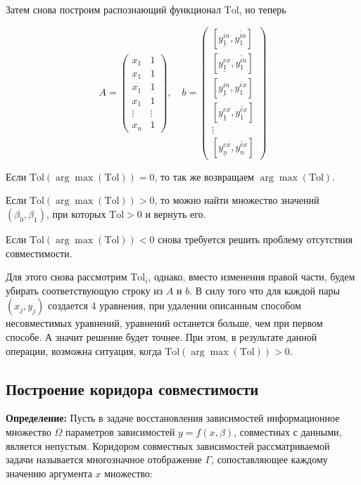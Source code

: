 Затем снова построим распознающий функционал $\text{Tol}$, но теперь

\begin{equation}
    A =
    \begin{pmatrix}
        x_1 & 1\\
        x_1 & 1\\
        x_1 & 1\\
        x_1 & 1\\
        \vdots & \vdots\\
        x_n & 1
    \end{pmatrix}, \quad
    b =
    \begin{pmatrix}
        [\underline{y_{1}^{in}}, \overline{y_{1}^{in}}]\\
        [\underline{y_{1}^{ex}}, \overline{y_{1}^{in}}]\\
        [\underline{y_{1}^{in}}, \overline{y_{1}^{ex}}]\\
        [\underline{y_{1}^{ex}}, \overline{y_{1}^{ex}}]\\
        \vdots \\
        [\underline{y_{n}^{ex}}, \overline{y_{n}^{ex}}]
    \end{pmatrix}
\end{equation}

Если $\text{Tol}(\arg\max(\text{Tol})) = 0$, то так же возвращаем $\arg\max(\text{Tol})$. 

Если $\text{Tol}(\arg\max(\text{Tol})) > 0$, то можно найти множество значений $(\beta_0, \beta_1)$, при которых $\text{Tol} > 0$ и вернуть его.

Если $\text{Tol}(\arg\max(\text{Tol})) < 0$ снова требуется решить проблему отсутствия совместимости.

Для этого снова рассмотрим $\text{Tol}_i$, однако, вместо изменения правой части, будем убирать соответствующую строку из $A$ и $b$. В силу того что для каждой пары $(x_j, y_j)$ создается 4 уравнения, при удалении описанным способом несовместимых уравнений, уравнений останется больше, чем при первом способе. А значит решение будет точнее. При этом, в результате данной операции, возможна ситуация, когда $\text{Tol}(\arg\max(\text{Tol})) > 0$.

\subsection{Построение коридора совместимости}
\textbf{Определение:} Пусть в задаче восстановления зависимостей информационное множество $\Omega$ параметров зависимостей $y=f(x,\beta)$, совместных с данными, является непустым. Коридором совместных зависимостей рассматриваемой задачи называется многозначное отображение $\Gamma$, сопоставляющее каждому значению аргумента $x$ множество:

